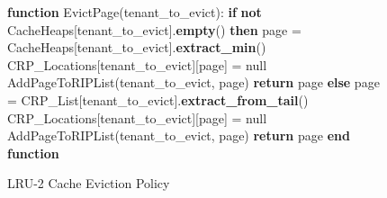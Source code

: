 \begin{figure}[htbp]
\begin{minipage}{\linewidth}
\begin{algorithm}[H]
\begin{algorithmic}
            \STATE
            \STATE \textbf{function} EvictPage(tenant\_to\_evict):
            \STATE \hspace{\algorithmicindent} \textbf{if} \textbf{not} CacheHeaps[tenant\_to\_evict].\textbf{empty}() \textbf{then}
            \STATE \hspace{\algorithmicindent} \hspace{\algorithmicindent} page = CacheHeaps[tenant\_to\_evict].\textbf{extract\_min}()
            \STATE \hspace{\algorithmicindent} \hspace{\algorithmicindent} CRP\_Locations[tenant\_to\_evict][page] = null
            \STATE \hspace{\algorithmicindent} \hspace{\algorithmicindent} AddPageToRIPList(tenant\_to\_evict, page)
            \STATE \hspace{\algorithmicindent} \hspace{\algorithmicindent} \textbf{return} page
            \STATE \hspace{\algorithmicindent} \textbf{else}
            \STATE \hspace{\algorithmicindent} \hspace{\algorithmicindent} page = CRP\_List[tenant\_to\_evict].\textbf{extract\_from\_tail}()
            \STATE \hspace{\algorithmicindent} \hspace{\algorithmicindent} CRP\_Locations[tenant\_to\_evict][page] = null
            \STATE \hspace{\algorithmicindent} \hspace{\algorithmicindent} AddPageToRIPList(tenant\_to\_evict, page)
            \STATE \hspace{\algorithmicindent} \hspace{\algorithmicindent} \textbf{return} page
            \STATE \textbf{end function}
        \end{algorithmic}
    \end{algorithm}
    \caption{LRU-2 Cache Eviction Policy}
    \label{fig:lru-2}
    \end{minipage}
\end{figure}

